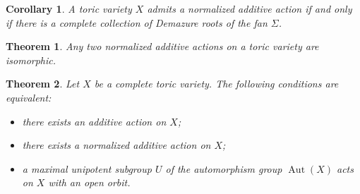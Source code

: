 \documentclass[a4paper,reqno,12pt]{amsart}
\DeclareMathOperator {\Aut}{Aut}
\newtheorem{corollary}{Corollary}
\newtheorem{theorem}{Theorem}
\theoremstyle{definition}
\begin{document}
\begin{corollary}
A toric variety $X$ admits a normalized additive action if and only if there is a complete collection of Demazure roots of the fan $\Sigma$.
\end{corollary}

\begin{theorem} {\cite[Theorem~2]{AR}}
Any two normalized additive actions on a toric variety are isomorphic.
\end{theorem}

\begin{theorem}{\cite[Theorem 3]{AR}}\label{3con}
Let $X$ be a complete toric variety. The following conditions are equivalent:
\begin{itemize}
\item[(1)]
  there exists an additive action on $X$;
\item[(2)]
  there exists a normalized additive action on $X$;
\item[(3)]
  a maximal unipotent subgroup $U$ of the automorphism group $\Aut(X)$ acts on $X$ with an open orbit.
\end{itemize}
\end{theorem}
\end{document}
